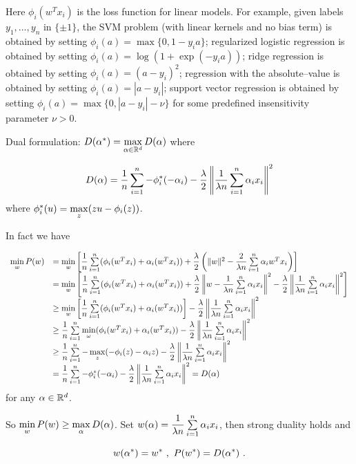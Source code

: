 Here $\phi_i(w^Tx_i)$ is the loss function for linear models. 
For example, given labels $y_1,...,y_n$ in $\{\pm 1\}$, the SVM problem (with linear kernels and no bias term)
is obtained by setting $\phi_i(a)=\max\{0, 1-y_ia\}$; regularized logistic regression is obtained by setting 
$\phi_i(a)=\log(1+\exp(-y_ia))$; ridge regression is obtained by setting $\phi_i(a)=(a-y_i)^2$;
regression with the absolute--value is obtained by setting $\phi_i(a)=|a-y_i|$; support vector regression
is obtained by setting $\phi_i(a)=\max\{0, |a-y_i|-\nu\}$ for some predefined insensitivity parameter $\nu>0$.

Dual formulation: $D(\alpha^*)=\max\limits_{\alpha\in \mathbb R^d}D(\alpha)$ where

$$D(\alpha)=\dfrac{1}{n}\sum\limits_{i=1}^n -\phi_i^*(-\alpha_i)
-\dfrac{\lambda}{2}\left\|\dfrac{1}{\lambda n}\sum\limits_{i=1}^n \alpha_ix_i\right\|^2$$
where $\phi_i^*(u)=\max\limits_{z}(zu-\phi_i(z))$. 

In fact we have

$$\begin{array}{ll}
\min\limits_w P(w) & =\min\limits_w \left[\dfrac{1}{n}\sum\limits_{i=1}^n (\phi_i(w^T x_i)+\alpha_i(w^Tx_i))+\dfrac{\lambda }{2}\left(\|w\|^2-\dfrac{2}{\lambda n}\sum\limits_{i=1}^n \alpha_iw^Tx_i\right)\right]
\\
& =\min\limits_w \left[\dfrac{1}{n}\sum\limits_{i=1}^n (\phi_i(w^T x_i)+\alpha_i(w^Tx_i))+\dfrac{\lambda }{2}\left\|w-\dfrac{1}{\lambda n}\sum\limits_{i=1}^n \alpha_i x_i\right\|^2-\dfrac{\lambda}{2}\left\|\dfrac{1}{\lambda n}\sum\limits_{i=1}^n \alpha_i x_i\right\|^2\right]
\\
& \geq \min\limits_w \left[\dfrac{1}{n}\sum\limits_{i=1}^n (\phi_i(w^T x_i)+\alpha_i(w^Tx_i))\right]-\dfrac{\lambda}{2}\left\|\dfrac{1}{\lambda n}\sum\limits_{i=1}^n \alpha_i x_i\right\|^2
\\
& \geq \dfrac{1}{n}\sum\limits_{i=1}^n \min\limits_{\omega}(\phi_i(w^T x_i)+\alpha_i(w^Tx_i))-\dfrac{\lambda}{2}\left\|\dfrac{1}{\lambda n}\sum\limits_{i=1}^n \alpha_i x_i\right\|^2
\\
& \geq \dfrac{1}{n}\sum\limits_{i=1}^n -\max\limits_{z}(-\phi_i(z)-\alpha_iz)-\dfrac{\lambda}{2}\left\|\dfrac{1}{\lambda n}\sum\limits_{i=1}^n \alpha_i x_i\right\|^2
\\
& = \dfrac{1}{n}\sum\limits_{i=1}^n -\phi_i^*(-\alpha_i)-\dfrac{\lambda}{2}\left\|\dfrac{1}{\lambda n}\sum\limits_{i=1}^n \alpha_i x_i\right\|^2=D(\alpha)
\end{array}$$
for any $\alpha\in \mathbb R^d$. 

So $\min\limits_w P(w)\geq \max\limits_\alpha D(\alpha)$. Set $w(\alpha)=\dfrac{1}{\lambda n}\sum\limits_{i=1}^n \alpha_i x_i$, then strong duality holds and 

$$w(\al^*)=w^* \ , \ P(w^*)=D(\al^*) \ .$$

